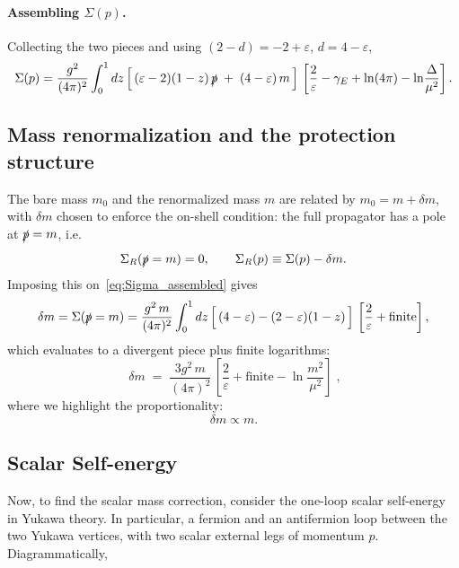 \documentclass[a4paper, 11pt]{article}
\begin{document}
\paragraph{Assembling $\Sigma(p)$.} Collecting the two pieces and using $(2-d) = -2 + \varepsilon$, $d = 4 - \varepsilon$,
\begin{equation}
    \Sigma(p) = \frac{g^2}{(4\pi)^2}\int_0^1 dz\,
    \Big[\,(\varepsilon - 2)(1-z)\,\slashed{p} \;+\; (4 - \varepsilon)\,m\,\Big]\,
    \left[\frac{2}{\varepsilon} - \gamma_E + \ln(4\pi) - \ln\!\frac{\Delta}{\mu^2}\right].
    \label{eq:Sigma_assembled}
\end{equation}

\subsection*{Mass renormalization and the protection structure}

The bare mass $m_0$ and the renormalized mass $m$ are related by $m_0 = m + \delta m$, with $\delta m$ chosen to enforce the on-shell condition: the full propagator has a pole at $\slashed{p} = m$, i.e.\
\begin{equation*}
    \Sigma_R(\slashed{p} = m) = 0, \qquad
    \Sigma_R(p) \equiv \Sigma(p) - \delta m.
\end{equation*}
Imposing this on~\eqref{eq:Sigma_assembled} gives
\begin{equation*}
    \delta m = \Sigma(\slashed{p} = m)
    = \frac{g^2\,m}{(4\pi)^2}\int_0^1 dz\,
    \Big[\,(4-\varepsilon) - (2-\varepsilon)(1-z)\,\Big]\,
    \left[\frac{2}{\varepsilon} + \text{finite}\right],
\end{equation*}
which evaluates to a divergent piece plus finite logarithms:
\begin{equation*}
    \;\delta m \;=\; \frac{3g^2\,m}{(4\pi)^2}\,
    \left[\frac{2}{\varepsilon} + \text{finite} - \ln\!\frac{m^2}{\mu^2}\right]\;,
\end{equation*}
where we highlight the proportionality:
\begin{equation*}
    \boxed{\;\delta m \propto m.\ }
\end{equation*}

\subsection{Scalar Self-energy}
\label{app:scalar_selfenergy}

Now, to find the scalar mass correction, consider the one-loop scalar self-energy in Yukawa theory. In particular, a fermion and an antifermion loop between the two Yukawa vertices, with two scalar external legs of momentum $p$. Diagrammatically,
\end{document}
